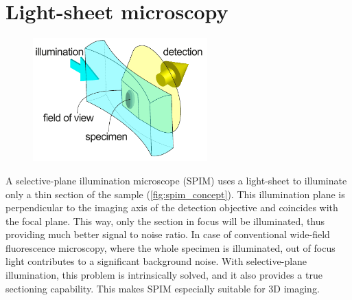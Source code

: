     




\section{Light-sheet microscopy}
  \label{sec:light-sheet}
  \begin{figure}[bt]
    \centering
    \includegraphics[width=0.6\textwidth]{spim_concept}
    \label{fig:spim_concept}
  \end{figure}

  A selective-plane illumination microscope (SPIM) uses a light-sheet to illuminate only a thin section of the sample (\autoref{fig:spim_concept}). This illumination plane is perpendicular to the imaging axis of the detection objective and coincides with the focal plane. This way, only the section in focus will be illuminated, thus providing much better signal to noise ratio. In case of conventional wide-field fluorescence microscopy, where the whole specimen is illuminated, out of focus light contributes to a significant background noise. 
  With selective-plane illumination, this problem is intrinsically solved, and it also provides a true sectioning capability. This makes SPIM especially suitable for 3D imaging.

